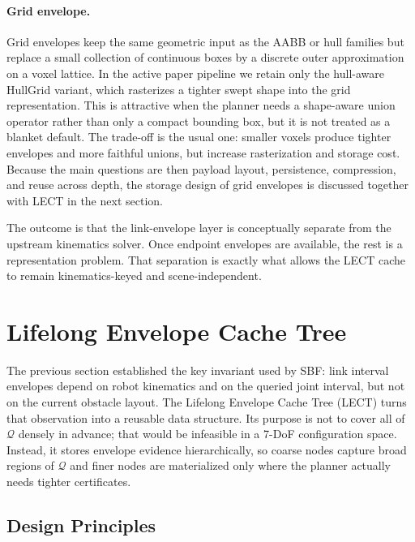 \documentclass[journal]{IEEEtran}
\DeclareRobustCommand{\textsc}[1]{\textnormal{\MakeUppercase{#1}}}
\newcommand{\sbf}{\textsc{SBF}}
\newcommand{\Q}{\ensuremath{\mathcal{Q}}}
\begin{document}
\paragraph{Grid envelope.}
Grid envelopes keep the same geometric input as the AABB or hull families but
replace a small collection of continuous boxes by a discrete outer
approximation on a voxel lattice. In the active paper pipeline we retain only
the hull-aware HullGrid variant, which rasterizes a tighter swept shape into
the grid representation. This is attractive when the planner needs a
shape-aware union operator rather than only a compact bounding box, but it is
not treated as a blanket default. The trade-off is the usual one: smaller
voxels produce tighter envelopes and more faithful unions, but increase
rasterization and storage cost. Because the main questions are then payload
layout, persistence, compression, and reuse across depth, the storage design of
grid envelopes is discussed together with LECT in the next section.

The outcome is that the link-envelope layer is conceptually separate from the
upstream kinematics solver. Once endpoint envelopes are available, the rest is a
representation problem. That separation is exactly what allows the LECT cache to
remain kinematics-keyed and scene-independent.

\section{Lifelong Envelope Cache Tree}\label{sec:lect}

The previous section established the key invariant used by \sbf{}: link
interval envelopes depend on robot kinematics and on the queried joint interval,
but not on the current obstacle layout. The Lifelong Envelope Cache Tree
(LECT) turns that observation into a reusable data structure. Its purpose is
not to cover all of $\Q$ densely in advance; that would be infeasible in a
7-DoF configuration space. Instead, it stores envelope evidence hierarchically,
so coarse nodes capture broad regions of $\Q$ and finer nodes are materialized
only where the planner actually needs tighter certificates.

\subsection{Design Principles}\label{sec:lect_design}
\end{document}
